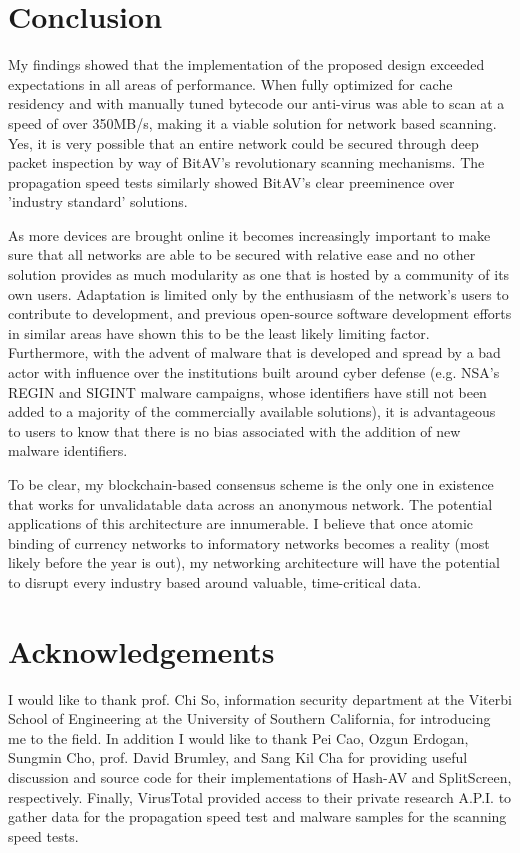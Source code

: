 \documentclass[12pt,journal]{IEEEtran}
\begin{document}
\section{Conclusion}
My findings showed that the implementation of the proposed design exceeded expectations in all areas of performance. When fully optimized for cache residency and with manually tuned bytecode our anti-virus was able to scan at a speed of over 350MB/s, making it a viable solution for network based scanning. Yes, it is very possible that an entire network could be secured through deep packet inspection by way of BitAV's revolutionary scanning mechanisms. The propagation speed tests similarly showed BitAV's clear preeminence over 'industry standard' solutions.\par

As more devices are brought online it becomes increasingly important to make sure that all networks are able to be secured with relative ease and no other solution provides as much modularity as one that is hosted by a community of its own users. Adaptation is limited only by the enthusiasm of the network's users to contribute to development, and previous open-source software development efforts in similar areas have shown this to be the least likely limiting factor. Furthermore, with the advent of malware that is developed and spread by a bad actor with influence over the institutions built around cyber defense (e.g. NSA's REGIN and SIGINT malware campaigns, whose identifiers have still not been added to a majority of the commercially available solutions), it is advantageous to users to know that there is no bias associated with the addition of new malware identifiers.\par

To be clear, my blockchain-based consensus scheme is the only one in existence that works for unvalidatable data across an anonymous network. The potential applications of this architecture are innumerable. I believe that once atomic binding of currency networks to informatory networks becomes a reality (most likely before the year is out), my networking architecture will have the potential to disrupt every industry based around valuable, time-critical data. 

\section{Acknowledgements}
I would like to thank prof. Chi So, information security department at the Viterbi School of Engineering at the University of Southern California, for introducing me to the field. In addition I would like to thank Pei Cao, Ozgun Erdogan, Sungmin Cho, prof. David Brumley, and Sang Kil Cha for providing useful discussion and source code for their implementations of Hash-AV and SplitScreen, respectively. Finally, VirusTotal provided access to their private research A.P.I. to gather data for the propagation speed test and malware samples for the scanning speed tests. 



\end{document}
